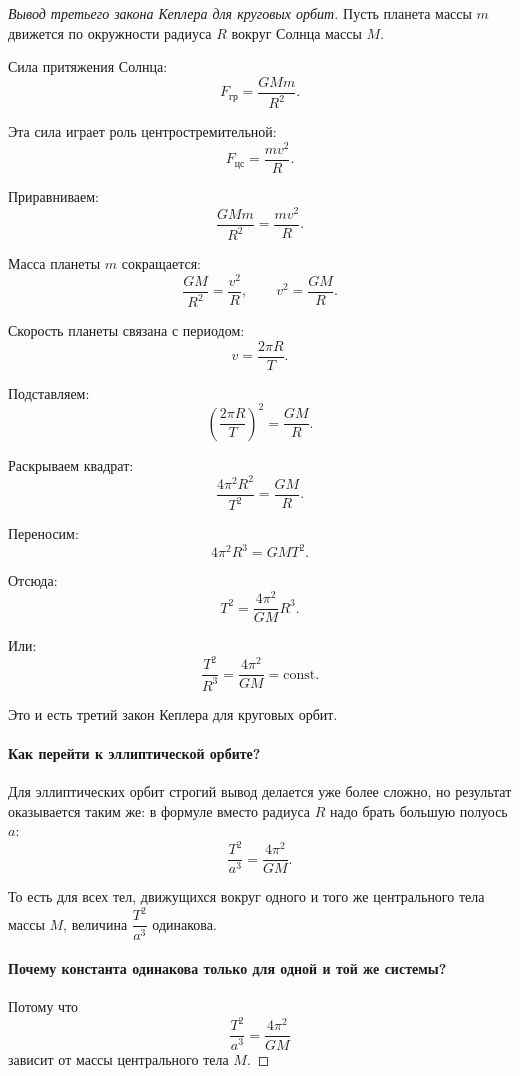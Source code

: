 \documentclass[12pt]{article}
\begin{document}
\begin{proof}[Вывод третьего закона Кеплера для круговых орбит]
	Пусть планета массы $m$ движется по окружности радиуса $R$ вокруг Солнца массы $M$.
    
    Сила притяжения Солнца:
    \[
    	F_{\text{гр}} = \frac{GMm}{R^2}.
    \]
    
    Эта сила играет роль центростремительной:
    \[
    	F_{\text{цс}} = \frac{mv^2}{R}.
    \]
    
    Приравниваем:
    \[
    	\frac{GMm}{R^2} = \frac{mv^2}{R}.
    \]
    
    Масса планеты $m$ сокращается:
    \[
    	\frac{GM}{R^2} = \frac{v^2}{R},
    \qquad
    v^2 = \frac{GM}{R}.
    \]
    
    Скорость планеты связана с периодом:
    \[
    	v = \frac{2\pi R}{T}.
    \]
    
    Подставляем:
    \[
    	\left(\frac{2\pi R}{T}\right)^2 = \frac{GM}{R}.
    \]
    
    Раскрываем квадрат:
    \[
    	\frac{4\pi^2 R^2}{T^2} = \frac{GM}{R}.
    \]
    
    Переносим:
    \[
    	4\pi^2 R^3 = GMT^2.
    \]
    
    Отсюда:
    \[
    	T^2 = \frac{4\pi^2}{GM}R^3.
    \]
    
    Или:
    \[
    	\boxed{\frac{T^2}{R^3} = \frac{4\pi^2}{GM} = \text{const}.}
    \]
    
    Это и есть третий закон Кеплера для круговых орбит.
    
    \paragraph{Как перейти к эллиптической орбите?}
    Для эллиптических орбит строгий вывод делается уже более сложно, но результат оказывается таким же:
    в формуле вместо радиуса $R$ надо брать большую полуось $a$:
    \[
    	\boxed{\frac{T^2}{a^3} = \frac{4\pi^2}{GM}.}
    \]
    
    То есть для всех тел, движущихся вокруг одного и того же центрального тела массы $M$,
    величина $\dfrac{T^2}{a^3}$ одинакова.
    
    \paragraph{Почему константа одинакова только для одной и той же системы?}
    Потому что
    \[
    	\frac{T^2}{a^3} = \frac{4\pi^2}{GM}
    \]
    зависит от массы центрального тела $M$.
\end{proof}
\end{document}
